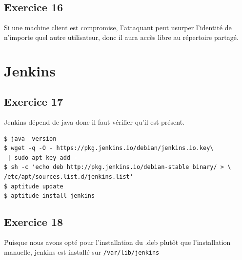 \documentclass{report}
\begin{document}
\subsection{Exercice 16}
Si une machine client est compromise, l'attaquant peut usurper l'identité de
n'importe quel autre utilisateur, donc il aura accès libre au répertoire partagé.
\section{Jenkins}
\subsection{Exercice 17}
Jenkins dépend de java donc il faut vérifier qu'il est présent.
\begin{tcolorbox}
  \begin{verbatim}
$ java -version
$ wget -q -O - https://pkg.jenkins.io/debian/jenkins.io.key\
 | sudo apt-key add -
$ sh -c 'echo deb http://pkg.jenkins.io/debian-stable binary/ > \
/etc/apt/sources.list.d/jenkins.list'
$ aptitude update
$ aptitude install jenkins
  \end{verbatim}
\end{tcolorbox}
\subsection{Exercice 18}
Puisque nous avons opté pour l'installation du .deb plutôt que l'installation
manuelle, jenkins est installé sur \texttt{/var/lib/jenkins}
\begin{tcolorbox}
  \begin{verbatim}
  \end{verbatim}
\end{tcolorbox}
\end{document}
